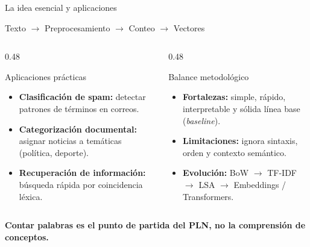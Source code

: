 \documentclass[aspectratio=169,10pt]{beamer}
\begin{document}
\begin{frame}[label={sec:org4210e0d}]{La idea esencial y aplicaciones}
\vspace{-0.5em}
\begin{center}
  \large
  Texto $\longrightarrow$ Preprocesamiento $\longrightarrow$ Conteo $\longrightarrow$ \alert{Vectores}
\end{center}

\smallskip
\begin{columns}[T,onlytextwidth]
  \begin{column}{0.48\textwidth}
    \begin{block}{Aplicaciones prácticas}
      \begin{itemize}\setlength{\itemsep}{0.3em}
        \item \textbf{Clasificación de spam:} detectar patrones de términos en correos.
        \item \textbf{Categorización documental:} asignar noticias a temáticas (política, deporte).
        \item \textbf{Recuperación de información:} búsqueda rápida por coincidencia léxica.
      \end{itemize}
    \end{block}
  \end{column}

  \begin{column}{0.48\textwidth}
    \begin{block}{Balance metodológico}
      \begin{itemize}\setlength{\itemsep}{0.3em}
        \item \textbf{Fortalezas:} simple, rápido, interpretable y sólida línea base (\textit{baseline}).
        \item \textbf{Limitaciones:} ignora sintaxis, orden y contexto semántico.
        \item \textbf{Evolución:} BoW $\rightarrow$ TF-IDF $\rightarrow$ LSA $\rightarrow$ Embeddings / Transformers.
      \end{itemize}
    \end{block}
  \end{column}
\end{columns}

\bigskip
\begin{center}
  \alert{\textbf{Contar palabras es el punto de partida del PLN, no la comprensión de conceptos.}}
\end{center}
\end{frame}
\end{document}

